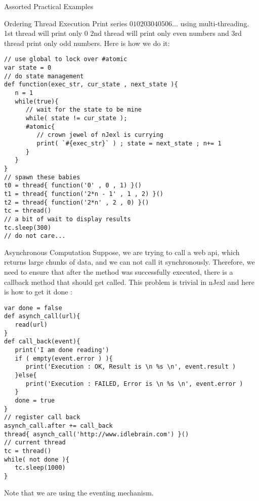\begin{section}{Assorted Practical Examples}
\begin{subsection}{Ordering Thread Execution}
Print series $010203040506...$ using multi-threading. 
1st thread will print only 0 2nd thread will print only even numbers and 3rd thread print only odd numbers. 
Here is how we do it:

\begin{center}\begin{minipage}{\linewidth}
\begin{lstlisting}[style=JexlStyle]
// use global to lock over #atomic
var state = 0 
// do state management 
def function(exec_str, cur_state , next_state ){
   n = 1 
   while(true){
      // wait for the state to be mine
      while( state != cur_state );
      #atomic{
         // crown jewel of nJexl is currying
         print( `#{exec_str}` ) ; state = next_state ; n+= 1 
      }
   } 
}
// spawn these babies 
t0 = thread{ function('0' , 0 , 1) }()
t1 = thread{ function('2*n - 1' , 1 , 2) }()
t2 = thread{ function('2*n' , 2 , 0) }()
tc = thread()
// a bit of wait to display results 
tc.sleep(300)
// do not care...
\end{lstlisting}  
\end{minipage}\end{center}
\end{subsection}

\begin{subsection}{Asynchronous Computation}
Suppose, we are trying to call a web api, which returns large chunks of data, 
and we can not call it synchronously. Therefore, we need to ensure that after
the method was successfully executed, there is a callback method that should get called.
This problem is trivial in nJexl and here is how to get it done :

\begin{center}\begin{minipage}{\linewidth}
\begin{lstlisting}[style=JexlStyle]
var done = false 
def asynch_call(url){
   read(url)
}
def call_back(event){
   print('I am done reading')
   if ( empty(event.error ) ){
      print('Execution : OK, Result is \n %s \n', event.result )
   }else{
      print('Execution : FAILED, Error is \n %s \n', event.error )
   }
   done = true 
}
// register call back 
asynch_call.after += call_back
thread{ asynch_call('http://www.idlebrain.com') }()
// current thread 
tc = thread()
while( not done ){
   tc.sleep(1000)
}
\end{lstlisting}  
\end{minipage}\end{center}
Note that we are using the eventing mechanism.
\end{subsection}


\end{section}
